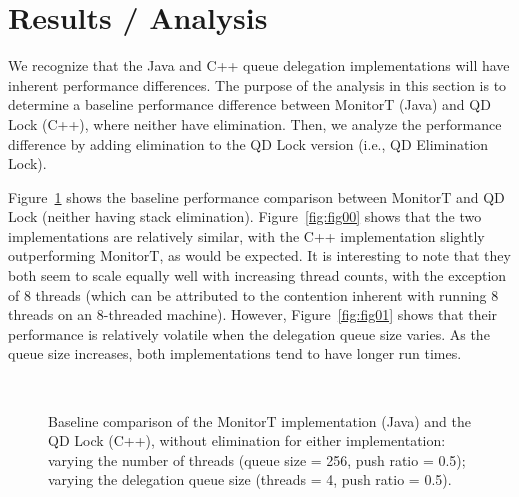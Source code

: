 \section{Results / Analysis}
We recognize that the Java and C++ queue delegation implementations will have inherent performance differences. The purpose of the analysis in this section is to determine a baseline performance difference between MonitorT (Java) and QD Lock (C++), where neither have elimination. Then, we analyze the performance difference by adding elimination to the QD Lock version (i.e., QD Elimination Lock).

Figure~\ref{fig:baseline} shows the baseline performance comparison between MonitorT and QD Lock (neither having stack elimination). Figure~\ref{fig:fig00} shows that the two implementations are relatively similar, with the C++ implementation slightly outperforming MonitorT, as would be expected. It is interesting to note that they both seem to scale equally well with increasing thread counts, with the exception of 8 threads (which can be attributed to the contention inherent with running 8 threads on an 8-threaded machine). However, Figure~\ref{fig:fig01} shows that their performance is relatively volatile when the delegation queue size varies. As the queue size increases, both implementations tend to have longer run times.

\begin{figure}[]
\centering
{}
\\
\caption[]{Baseline comparison of the MonitorT implementation (Java) and the QD Lock (C++), without elimination for either implementation:  varying the number of threads (queue size = 256, push ratio = 0.5);  varying the delegation queue size (threads = 4, push ratio = 0.5).}
\label{fig:baseline}
\end{figure}

